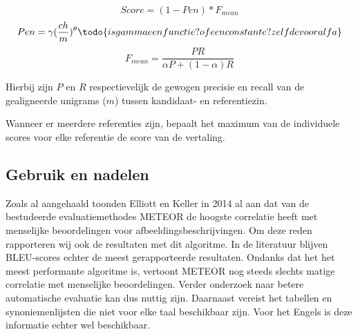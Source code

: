 \begin{equation}
Score = (1 - Pen)*F_{mean}
\end{equation} 
\begin{equation}
Pen = \gamma (\frac{ch}{m})^\theta \todo{is gamma een functie? of een constante? zelfde voor alfa}
\end{equation}
\begin{equation}
F_{mean} = \frac{PR}{\alpha P + (1- \alpha)R}
\end{equation}

Hierbij zijn $P$ en $R$ respectievelijk de gewogen precisie en recall van de gealigneerde unigrams ($m$) tussen kandidaat- en referentiezin.

Wanneer er meerdere referenties zijn, bepaalt het maximum van de individuele scores voor elke referentie de score van de vertaling.

\subsection{Gebruik en nadelen}
Zoals al aangehaald toonden Elliott en Keller in 2014 al aan dat van de bestudeerde evaluatiemethodes METEOR de hoogste correlatie heeft met menselijke beoordelingen voor afbeeldingsbeschrijvingen. Om deze reden rapporteren wij ook de resultaten met dit algoritme. In de literatuur blijven BLEU-scores echter de meest gerapporteerde resultaten.
Ondanks dat het het meest performante algoritme is, vertoont METEOR nog steeds slechts matige correlatie met menselijke beoordelingen. Verder onderzoek naar betere automatische evaluatie kan dus nuttig zijn. Daarnaast vereist het tabellen en synoniemenlijsten die niet voor elke taal beschikbaar zijn. Voor het Engels is deze informatie echter wel beschikbaar. 


